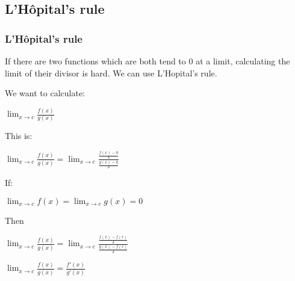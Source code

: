 
\subsection{L'Hôpital's rule}

\subsubsection{L'Hôpital's rule}

If there are two functions which are both tend to \(0\) at a limit, calculating the limit of their divisor is hard. We can use L'Hopital's rule.

We want to calculate:

\(\lim_{x\rightarrow c}\frac{f(x)}{g(x)}\)

This is:

\(\lim_{x\rightarrow c}\frac{f(x)}{g(x)}=\lim_{x\rightarrow c}\frac{\frac{f(x)-0}{\delta}}{\frac{g(x)-0}{\delta}}\)

If:

\(\lim_{x\rightarrow c}f(x)=\lim_{x\rightarrow c}g(x)=0\)

Then

\(\lim_{x\rightarrow c}\frac{f(x)}{g(x)}=\lim_{x\rightarrow c}\frac{\frac{f(x)-f(c)}{\delta}}{\frac{g(x)-f(c)}{\delta}}\)

\(\lim_{x\rightarrow c}\frac{f(x)}{g(x)}=\frac{f'(x)}{g'(x)}\)

